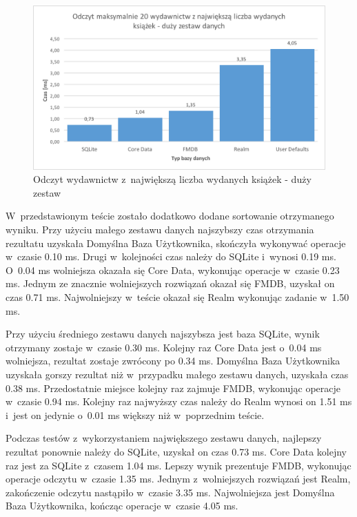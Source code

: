 \begin{figure}[H]
\centering
	\includegraphics[width=13.5cm]{img/read_data/read_by_publishers/read_by_publishers_big_test.png}
	\caption{Odczyt wydawnictw z~największą liczba wydanych książek - duży zestaw}
	\label{fig: read-by-publishers-big}
\end{figure}

 W~przedstawionym teście zostało dodatkowo dodane sortowanie otrzymanego wyniku. Przy użyciu małego zestawu danych najszybszy czas otrzymania rezultatu uzyskała Domyślna Baza Użytkownika, skończyła wykonywać operacje w~czasie 0.10 ms. Drugi w~kolejności czas należy do SQLite i~wynosi 0.19 ms. O~0.04 ms wolniejsza okazała się Core Data, wykonując operacje w~czasie 0.23 ms. Jednym ze znacznie wolniejszych rozwiązań okazał się FMDB, uzyskał on czas 0.71 ms. Najwolniejszy w~teście okazał się Realm wykonując zadanie w~1.50 ms.\par

Przy użyciu średniego zestawu danych najszybsza jest baza SQLite, wynik otrzymany zostaje w~czasie 0.30 ms. Kolejny raz Core Data jest o~0.04 ms wolniejsza, rezultat zostaje zwrócony po 0.34 ms. Domyślna Baza Użytkownika uzyskała gorszy rezultat niż w~przypadku małego zestawu danych, uzyskała czas 0.38 ms. Przedostatnie miejsce kolejny raz zajmuje FMDB, wykonując operacje w~czasie 0.94 ms. Kolejny raz najwyższy czas należy do Realm wynosi on 1.51 ms i~jest on jedynie o~0.01 ms większy niż w~poprzednim teście.\par

Podczas testów z~wykorzystaniem największego zestawu danych, najlepszy rezultat ponownie należy do SQLite, uzyskał on czas 0.73 ms. Core Data kolejny raz jest za SQLite z~czasem 1.04 ms. Lepszy wynik prezentuje FMDB, wykonując operacje odczytu w~czasie 1.35 ms. Jednym z~wolniejszych rozwiązań jest Realm, zakończenie odczytu nastąpiło w~czasie 3.35 ms. Najwolniejsza jest Domyślna Baza Użytkownika, kończąc operacje w~czasie 4.05 ms. 

